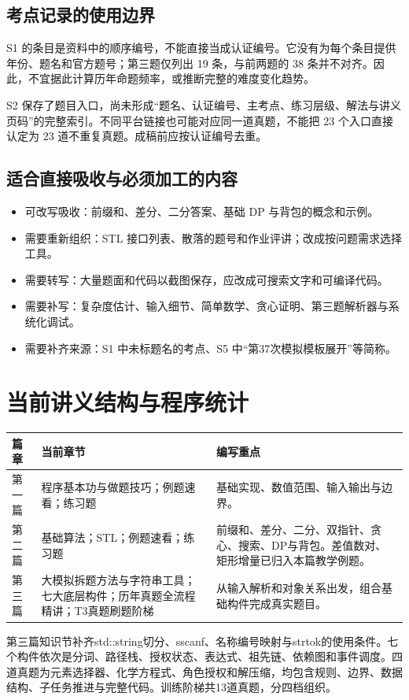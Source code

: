 \documentclass[UTF8,11pt,a4paper,fontset=none]{ctexart}
\begin{document}
\subsection{考点记录的使用边界}
S1 的条目是资料中的顺序编号，不能直接当成认证编号。它没有为每个条目提供年份、题名和官方题号；第三题仅列出 19 条，与前两题的 38 条并不对齐。因此，不宜据此计算历年命题频率，或推断完整的难度变化趋势。

S2 保存了题目入口，尚未形成“题名、认证编号、主考点、练习层级、解法与讲义页码”的完整索引。不同平台链接也可能对应同一道真题，不能把 23 个入口直接认定为 23 道不重复真题。成稿前应按认证编号去重。

\subsection{适合直接吸收与必须加工的内容}
\begin{itemize}
\item 可改写吸收：前缀和、差分、二分答案、基础 DP 与背包的概念和示例。
\item 需要重新组织：STL 接口列表、散落的题号和作业评讲；改成按问题需求选择工具。
\item 需要转写：大量题面和代码以截图保存，应改成可搜索文字和可编译代码。
\item 需要补写：复杂度估计、输入细节、简单数学、贪心证明、第三题解析器与系统化调试。
\item 需要补齐来源：S1 中未标题名的考点、S5 中“第37次模拟模板展开”等简称。
\end{itemize}

\section{当前讲义结构与程序统计}
\begin{longtable}{P{2cm}P{5cm}P{7.8cm}}
\toprule 篇章 & 当前章节 & 编写重点\\\midrule\endhead
第一篇 & 程序基本功与做题技巧；例题速看；练习题 & 基础实现、数值范围、输入输出与边界。\\
第二篇 & 基础算法；STL；例题速看；练习题 & 前缀和、差分、二分、双指针、贪心、搜索、DP与背包。差值数对、矩形增量已归入本篇教学例题。\\
第三篇 & 大模拟拆题方法与字符串工具；七大底层构件；历年真题全流程精讲；T3真题刷题阶梯 & 从输入解析和对象关系出发，组合基础构件完成真实题目。\\
\bottomrule\end{longtable}

第三篇知识节补齐std::string切分、sscanf、名称编号映射与strtok的使用条件。七个构件依次是分词、路径栈、授权状态、表达式、祖先链、依赖图和事件调度。四道真题为元素选择器、化学方程式、角色授权和解压缩，均包含规则、边界、数据结构、子任务推进与完整代码。训练阶梯共13道真题，分四档组织。
\end{document}
